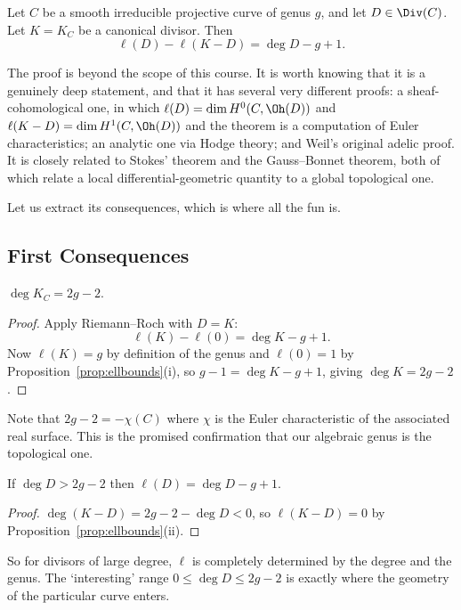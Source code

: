 \begin{theorem}\label{thm:RR}
	Let $C$ be a smooth irreducible projective curve of genus $g$, and let $D \in \Div(C)$. Let $K = K_C$ be a canonical divisor. Then
	$$\ell(D) - \ell(K - D) = \deg D - g + 1.$$
\end{theorem}

The proof is beyond the scope of this course. It is worth knowing that it is a genuinely deep statement, and that it has several very different proofs: a sheaf-cohomological one, in which $\ell(D) = \dim H^0(C,\Oh(D))$ and $\ell(K-D) = \dim H^1(C,\Oh(D))$ and the theorem is a computation of Euler characteristics; an analytic one via Hodge theory; and Weil's original adelic proof. It is closely related to Stokes' theorem and the Gauss--Bonnet theorem, both of which relate a local differential-geometric quantity to a global topological one.

Let us extract its consequences, which is where all the fun is.

\subsection{First Consequences}

\begin{corollary}\label{cor:degK}
	$\deg K_C = 2g - 2$.
\end{corollary}

\begin{proof}
	Apply Riemann--Roch with $D = K$:
	$$\ell(K) - \ell(0) = \deg K - g + 1.$$
	Now $\ell(K) = g$ by definition of the genus and $\ell(0) = 1$ by Proposition~\ref{prop:ellbounds}(i), so $g - 1 = \deg K - g + 1$, giving $\deg K = 2g-2$.
\end{proof}

Note that $2g-2 = -\chi(C)$ where $\chi$ is the Euler characteristic of the associated real surface. This is the promised confirmation that our algebraic genus is the topological one.

\begin{corollary}\label{cor:RRlarge}
	If $\deg D > 2g - 2$ then $\ell(D) = \deg D - g + 1$.
\end{corollary}

\begin{proof}
	$\deg(K - D) = 2g-2-\deg D < 0$, so $\ell(K-D) = 0$ by Proposition~\ref{prop:ellbounds}(ii).
\end{proof}

So for divisors of large degree, $\ell$ is completely determined by the degree and the genus. The `interesting' range $0 \leq \deg D \leq 2g-2$ is exactly where the geometry of the particular curve enters.


